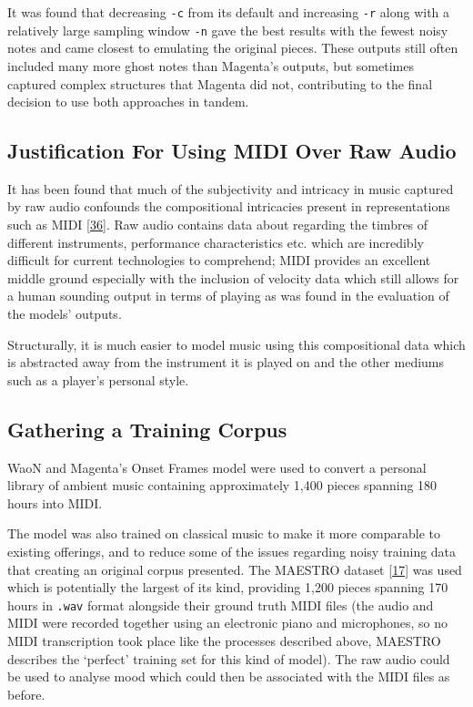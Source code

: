 \documentclass[12pt,]{article}
\begin{document}
It was found that decreasing \texttt{-c} from its default and increasing
\texttt{-r} along with a relatively large sampling window \texttt{-n}
gave the best results with the fewest noisy notes and came closest to
emulating the original pieces. These outputs still often included many
more ghost notes than Magenta's outputs, but sometimes captured complex
structures that Magenta did not, contributing to the final decision to
use both approaches in tandem.

\hypertarget{justification-for-using-midi-over-raw-audio}{%
\subsection{Justification For Using MIDI Over Raw
Audio}\label{justification-for-using-midi-over-raw-audio}}

It has been found that much of the subjectivity and intricacy in music
captured by raw audio confounds the compositional intricacies present in
representations such as MIDI
{[}\protect\hyperlink{ref-dai2018music}{36}{]}. Raw audio contains data
about regarding the timbres of different instruments, performance
characteristics etc. which are incredibly difficult for current
technologies to comprehend; MIDI provides an excellent middle ground
especially with the inclusion of velocity data which still allows for a
human sounding output in terms of playing as was found in the evaluation
of the models' outputs.

Structurally, it is much easier to model music using this compositional
data which is abstracted away from the instrument it is played on and
the other mediums such as a player's personal style.

\hypertarget{gathering-a-training-corpus}{%
\subsection{Gathering a Training
Corpus}\label{gathering-a-training-corpus}}

WaoN and Magenta's Onset Frames model were used to convert a personal
library of ambient music containing approximately 1,400 pieces spanning
180 hours into MIDI.

The model was also trained on classical music to make it more comparable
to existing offerings, and to reduce some of the issues regarding noisy
training data that creating an original corpus presented. The MAESTRO
dataset {[}\protect\hyperlink{ref-maestro2018}{17}{]} was used which is
potentially the largest of its kind, providing 1,200 pieces spanning 170
hours in \texttt{.wav} format alongside their ground truth MIDI files
(the audio and MIDI were recorded together using an electronic piano and
microphones, so no MIDI transcription took place like the processes
described above, MAESTRO describes the `perfect' training set for this
kind of model). The raw audio could be used to analyse mood which could
then be associated with the MIDI files as before.
\end{document}
